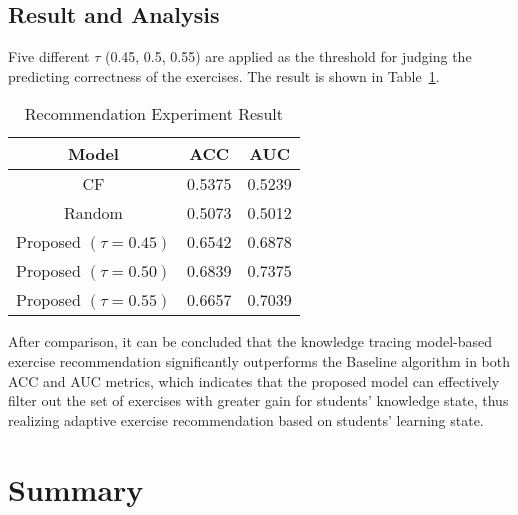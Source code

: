 \subsection{Result and Analysis}
Five different \(\tau \) (0.45, 0.5, 0.55) are applied as the threshold for judging the predicting correctness of the exercises. The result is shown in Table~\ref{table:ch4-exp-result}.
\begin{table}[htbp!]
  \caption{Recommendation Experiment Result}\label{table:ch4-exp-result}
  \centering
  \begin{tabular}{c c c}
    \toprule
    Model                    & ACC    & AUC    \\
    \midrule
    CF                       & 0.5375 & 0.5239 \\
    Random                   & 0.5073 & 0.5012 \\
    \midrule
    Proposed \((\tau=0.45)\) & 0.6542 & 0.6878 \\
    Proposed \((\tau=0.50)\) & 0.6839 & 0.7375 \\
    Proposed \((\tau=0.55)\) & 0.6657 & 0.7039 \\
    \bottomrule
  \end{tabular}
\end{table}
After comparison, it can be concluded that the knowledge tracing model-based exercise recommendation significantly outperforms the Baseline algorithm in both ACC and AUC metrics, which indicates that the proposed model can effectively filter out the set of exercises with greater gain for students' knowledge state, thus realizing adaptive exercise recommendation based on students' learning state.

\section{Summary}

